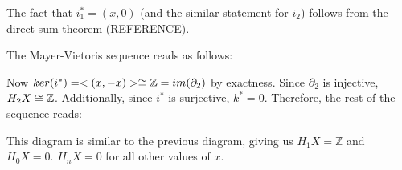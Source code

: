 \begin{example}
The fact that $i_1^*=(x,0)$ (and the similar statement for $i_2$) follows from the direct sum theorem (REFERENCE).

The Mayer-Vietoris sequence reads as follows:


Now $ker(i^*)=<(x,-x)>\cong \mathbb{Z}=im(\partial_2)$ by exactness. Since $\partial_2$ is injective, $H_2 X\cong \mathbb{Z}$. Additionally, since $i^*$ is surjective, $k^*=0$. Therefore, the rest of the sequence reads:


This diagram is similar to the previous diagram, giving us $H_1 X=\mathbb{Z}$ and $H_0 X= 0$. $H_nX =0$ for all other values of $x$.
\end{example}
